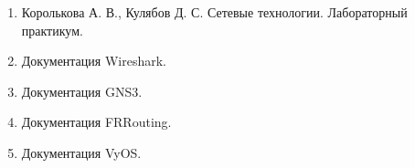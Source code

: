 \documentclass[
  english,
  russian,
  12pt,
  a4paper,
  DIV=11,
  numbers=noendperiod]{scrreprt}
\providecommand{\tightlist}{%
  \setlength{\itemsep}{0pt}\setlength{\parskip}{0pt}}
\begin{document}
\begin{enumerate}
\def\labelenumi{\arabic{enumi}.}
\tightlist
\item
  Королькова А. В., Кулябов Д. С. Сетевые технологии. Лабораторный
  практикум.
\item
  Документация Wireshark.
\item
  Документация GNS3.
\item
  Документация FRRouting.
\item
  Документация VyOS.
\end{enumerate}


\printbibliography
\end{document}
